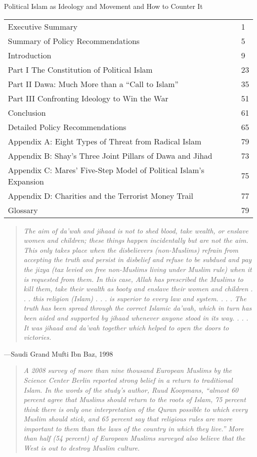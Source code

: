 \documentclass[10pt,titlepage]{book}
\begin{document}
Political Islam as
Ideology and Movement
and How to Counter It 

\begin{small}
\begin{tabular}{l l}
Executive Summary & 1\\
Summary of Policy Recommendations&5\\
Introduction&9\\
Part I The Constitution of Political Islam&23\\
Part II Dawa: Much More than a “Call to Islam”&35\\
Part III Confronting Ideology to Win the War&51\\
Conclusion&61\\
Detailed Policy Recommendations&65\\
Appendix A: Eight Types of Threat from Radical Islam&79\\
Appendix B: Shay’s Three Joint Pillars of Dawa and Jihad&73\\
Appendix C: Mares’ Five-Step Model of Political Islam’s
Expansion&75\\
Appendix D: Charities and the Terrorist Money Trail&77\\
Glossary&79\\
\end{tabular}
\end{small}

\begin{quote}
{\it
The aim of da’wah and jihaad is not to shed blood, take wealth,
or enslave women and children; these things happen incidentally but are not the aim. This only takes place when the
disbelievers (non-Muslims) refrain from accepting the truth
and persist in disbelief and refuse to be subdued and pay the
jizya (tax levied on free non-Muslims living under Muslim
rule) when it is requested from them. In this case, Allah has
prescribed the Muslims to kill them, take their wealth as booty
and enslave their women and children . . . this religion (Islam)
. . . is superior to every law and system. . . . The truth has been
spread through the correct Islamic da’wah, which in turn has
been aided and supported by jihaad whenever anyone stood in
its way. . . . It was jihaad and da’wah together which helped to
open the doors to victories.
}
\end{quote}
—Saudi Grand Mufti Ibn Baz, 1998

\begin{quote}
{\it
A 2008 survey of more than nine thousand European Muslims
by the Science Center Berlin reported strong belief in a return
to traditional Islam. In the words of the study’s author, Ruud
Koopmans, “almost 60 percent agree that Muslims should return
to the roots of Islam, 75 percent think there is only one interpretation of the Quran possible to which every Muslim should stick,
and 65 percent say that religious rules are more important to
them than the laws of the country in which they live.” More than
half (54 percent) of European Muslims surveyed also believe
that the West is out to destroy Muslim culture.
}
\end{quote}
\end{document}
